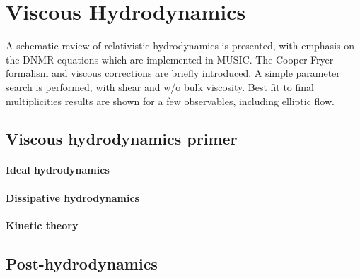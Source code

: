 \setchapterpreamble[u]{\margintoc}
\chapter{Viscous Hydrodynamics}

\begin{preview}[]
A schematic review of relativistic hydrodynamics is presented, with emphasis on the {\sffamily DNMR} equations which are implemented in {\sffamily MUSIC}. The Cooper-Fryer formalism and viscous corrections are briefly introduced. A simple parameter search is performed, with shear and w/o bulk viscosity. Best fit to final multiplicities results are shown for a few observables, including elliptic flow.
\end{preview}

\section{Viscous hydrodynamics primer}
\subsubsection*{Ideal hydrodynamics}


\subsubsection*{Dissipative hydrodynamics}


\subsubsection*{Kinetic theory}


\section{Post-hydrodynamics}
